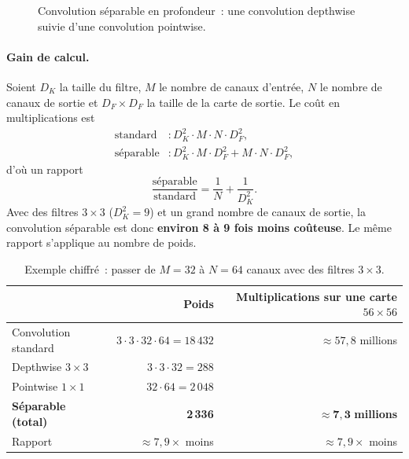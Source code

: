 \begin{figure}[H]
\centering
{}
\caption{Convolution séparable en profondeur~: une convolution depthwise suivie d’une convolution pointwise.}\label{fig:dwsep}
\end{figure}

\paragraph{Gain de calcul.} Soient $D_K$ la taille du filtre, $M$ le nombre de canaux d’entrée, $N$ le nombre de canaux de sortie et $D_F\times D_F$ la taille de la carte de sortie. Le coût en multiplications est
\begin{align}
  \text{standard} &: D_K^2\cdot M\cdot N\cdot D_F^2, \\
  \text{séparable} &: D_K^2\cdot M\cdot D_F^2 + M\cdot N\cdot D_F^2,
\end{align}
d’où un rapport
\begin{equation}
  \frac{\text{séparable}}{\text{standard}} = \frac{1}{N} + \frac{1}{D_K^2}.
\end{equation}
Avec des filtres $3\times3$ ($D_K^2=9$) et un grand nombre de canaux de sortie, la convolution séparable est donc \textbf{environ 8 à 9 fois moins coûteuse}. Le même rapport s’applique au nombre de poids.

\begin{table}[H]
\centering
\caption{Exemple chiffré~: passer de $M=32$ à $N=64$ canaux avec des filtres $3\times3$.}\label{tab:sep}
\small
\begin{tabular}{@{}lrr@{}}
\toprule
 & \textbf{Poids} & \textbf{Multiplications sur une carte $56\times56$} \\
\midrule
Convolution standard & $3\cdot3\cdot32\cdot64 = 18\,432$ & $\approx 57{,}8$ millions \\
Depthwise $3\times3$ & $3\cdot3\cdot32 = 288$ & \\
Pointwise $1\times1$ & $32\cdot64 = 2\,048$ & \\
\textbf{Séparable (total)} & \textbf{2\,336} & $\approx \mathbf{7{,}3}$ \textbf{millions} \\
\midrule
Rapport & $\approx 7{,}9\times$ moins & $\approx 7{,}9\times$ moins \\
\bottomrule
\end{tabular}
\end{table}


